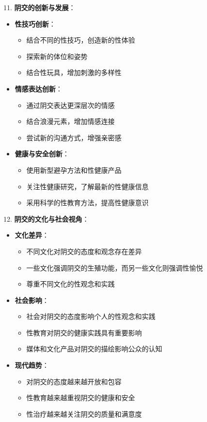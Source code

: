 \documentclass[12pt,UTF8]{ctexbook}
\begin{document}
11. \textbf{阴交的创新与发展}：
\begin{itemize}
	\item \textbf{性技巧创新}：
	\begin{itemize}
		\item 结合不同的性技巧，创造新的性体验
		\item 探索新的体位和姿势
		\item 结合性玩具，增加刺激的多样性
	\end{itemize}
	\item \textbf{情感表达创新}：
	\begin{itemize}
		\item 通过阴交表达更深层次的情感
		\item 结合浪漫元素，增加情感连接
		\item 尝试新的沟通方式，增强亲密感
	\end{itemize}
	\item \textbf{健康与安全创新}：
	\begin{itemize}
		\item 使用新型避孕方法和性健康产品
		\item 关注性健康研究，了解最新的性健康信息
		\item 采用科学的性教育方法，提高性健康意识
	\end{itemize}
\end{itemize}

12. \textbf{阴交的文化与社会视角}：
\begin{itemize}
	\item \textbf{文化差异}：
	\begin{itemize}
		\item 不同文化对阴交的态度和观念存在差异
		\item 一些文化强调阴交的生殖功能，而另一些文化则强调性愉悦
		\item 尊重不同文化的性观念和实践
	\end{itemize}
	\item \textbf{社会影响}：
	\begin{itemize}
		\item 社会对阴交的态度影响个人的性观念和实践
		\item 性教育对阴交的健康实践具有重要影响
		\item 媒体和文化产品对阴交的描绘影响公众的认知
	\end{itemize}
	\item \textbf{现代趋势}：
	\begin{itemize}
		\item 对阴交的态度越来越开放和包容
		\item 性教育越来越重视阴交的健康和安全
		\item 性治疗越来越关注阴交的质量和满意度
	\end{itemize}
\end{itemize}
\end{document}
